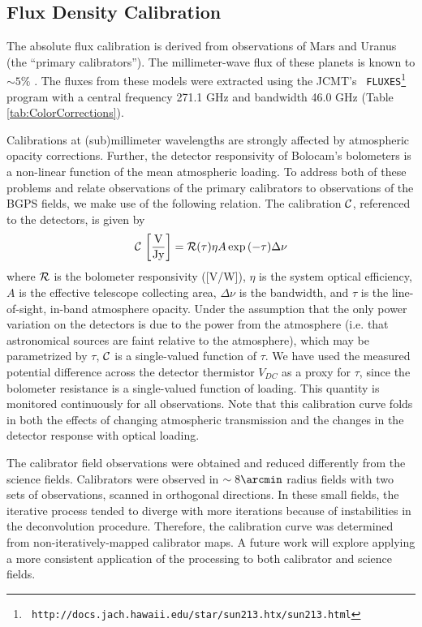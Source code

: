 \documentclass[12pt,preprint]{aastex}
\begin{document}
\subsection{Flux Density Calibration}
\label{sec:FluxCalibration}

The absolute flux calibration is derived from observations of Mars and
Uranus (the ``primary calibrators'').  The millimeter-wave flux of
these planets is known to $\sim 5\%$ \citep{orton86,griffin93}.  The
fluxes from these models were extracted using the JCMT's {\tt
FLUXES}\footnote{{\tt
http://docs.jach.hawaii.edu/star/sun213.htx/sun213.html}} program with
a central frequency 271.1 GHz and bandwidth 46.0 GHz (Table
\ref{tab:ColorCorrections}).  

Calibrations at (sub)millimeter wavelengths are strongly affected by
atmospheric opacity corrections.  Further, the detector responsivity
of Bolocam's bolometers is a non-linear function of the mean
atmospheric loading. To address both of these problems and relate
observations of the primary calibrators to observations of the BGPS
fields, we make use of the following relation.  The calibration ${\cal
C}$, referenced to the detectors, is given by
\begin{equation}
\label{eq:Calibration}
{\cal C} \, \left[\mathrm{\frac{V}{Jy}}\right] = 
{\cal R}(\tau) \eta A \exp{(-\tau)} \Delta\nu
\end{equation}
where ${\cal R}$ is the bolometer responsivity ([V/W]), $\eta$ is the
system optical efficiency, $A$ is the effective telescope collecting
area, $\Delta \nu$ is the bandwidth, and $\tau$ is the line-of-sight,
in-band atmosphere opacity.  Under the assumption that the only power
variation on the detectors is due to the power from the atmosphere
(i.e.  that astronomical sources are faint relative to the
atmosphere), which may be parametrized by $\tau$, ${\cal C}$ is a
single-valued function of $\tau$.  We have used the measured potential
difference across the detector thermistor $V_{DC}$ as a proxy for
$\tau$, since the bolometer resistance is a single-valued function of
loading.  This quantity is monitored continuously for all
observations.  Note that this calibration curve folds in both the
effects of changing atmospheric transmission and the changes in the
detector response with optical loading.

The calibrator field observations were obtained and reduced
differently from the science fields.  Calibrators were observed in
$\sim8\arcmin$ radius fields with two sets of observations, scanned in
orthogonal directions.  In these small fields, the iterative process
tended to diverge with more iterations because of instabilities in the
deconvolution procedure.  Therefore, the calibration curve was
determined from non-iteratively-mapped calibrator maps.  A future work
will explore applying a more consistent application of the processing
to both calibrator and science fields.
\end{document}
